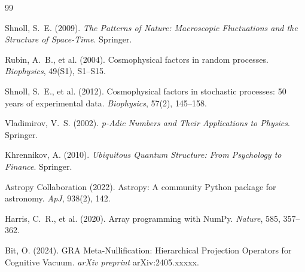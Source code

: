\documentclass[12pt,a4paper]{article}
\theoremstyle{plain}
\theoremstyle{definition}
\begin{document}
\begin{thebibliography}{99}

Shnoll, S.~E. (2009).
\newblock \emph{The Patterns of Nature: Macroscopic Fluctuations and the Structure of Space-Time}.
\newblock Springer.

Rubin, A.~B., et al. (2004).
\newblock Cosmophysical factors in random processes.
\newblock \emph{Biophysics}, 49(S1), S1--S15.

Shnoll, S.~E., et al. (2012).
\newblock Cosmophysical factors in stochastic processes: 50 years of experimental data.
\newblock \emph{Biophysics}, 57(2), 145--158.

Vladimirov, V.~S. (2002).
\newblock \emph{p-Adic Numbers and Their Applications to Physics}.
\newblock Springer.

Khrennikov, A. (2010).
\newblock \emph{Ubiquitous Quantum Structure: From Psychology to Finance}.
\newblock Springer.

Astropy Collaboration (2022).
\newblock Astropy: A community Python package for astronomy.
\newblock \emph{ApJ}, 938(2), 142.

Harris, C.~R., et al. (2020).
\newblock Array programming with NumPy.
\newblock \emph{Nature}, 585, 357--362.

Bit, O. (2024).
\newblock GRA Meta-Nullification: Hierarchical Projection Operators for Cognitive Vacuum.
\newblock \emph{arXiv preprint} arXiv:2405.xxxxx.

\end{thebibliography}

\end{document}
